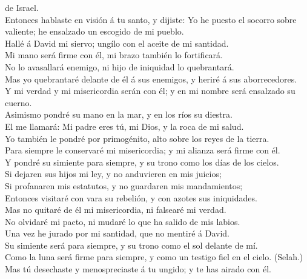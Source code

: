 de Israel.\\
 Entonces hablaste en visión á tu santo, y dijiste: Yo he
puesto el socorro sobre valiente; he ensalzado un escogido de mi
pueblo.\\
 Hallé á David mi siervo; ungílo con el aceite de mi
santidad.\\
 Mi mano será firme con él, mi brazo también lo
fortificará.\\
 No lo avasallará enemigo, ni hijo de iniquidad lo
quebrantará.\\
 Mas yo quebrantaré delante de él á sus enemigos, y heriré
á sus aborrecedores.\\
 Y mi verdad y mi misericordia serán con él; y en mi nombre
será ensalzado su cuerno.\\
 Asimismo pondré su mano en la mar, y en los ríos su
diestra.\\
 El me llamará: Mi padre eres tú, mi Dios, y la roca de mi
salud.\\
 Yo también le pondré por primogénito, alto sobre los reyes
de la tierra.\\
 Para siempre le conservaré mi misericordia; y mi alianza
será firme con él.\\
 Y pondré su simiente para siempre, y su trono como los
días de los cielos.\\
 Si dejaren sus hijos mi ley, y no anduvieren en mis
juicios;\\
 Si profanaren mis estatutos, y no guardaren mis
mandamientos;\\
 Entonces visitaré con vara su rebelión, y con azotes sus
iniquidades.\\
 Mas no quitaré de él mi misericordia, ni falsearé mi
verdad.\\
 No olvidaré mi pacto, ni mudaré lo que ha salido de mis
labios.\\
 Una vez he jurado por mi santidad, que no mentiré á
David.\\
 Su simiente será para siempre, y su trono como el sol
delante de mí.\\
 Como la luna será firme para siempre, y como un testigo
fiel en el cielo. (Selah.)\\
 Mas tú desechaste y menospreciaste á tu ungido; y te has
airado con él.\\

